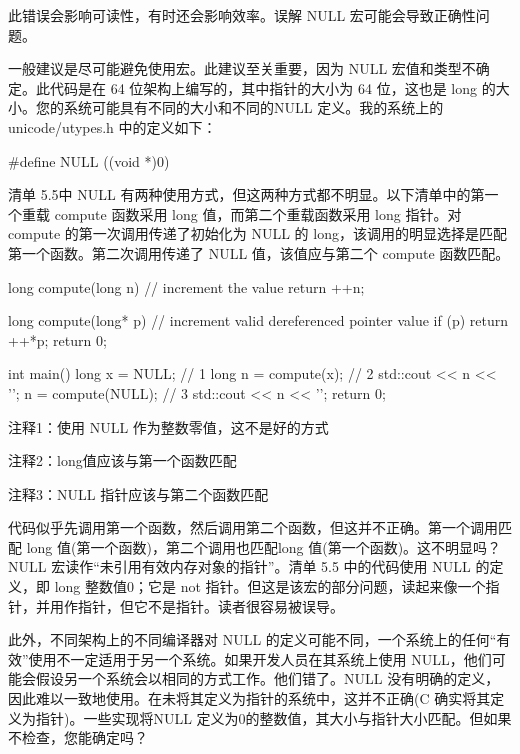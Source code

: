 此错误会影响可读性，有时还会影响效率。误解 NULL 宏可能会导致正确性问题。


一般建议是尽可能避免使用宏。此建议至关重要，因为 NULL 宏值和类型不确定。此代码是在 64 位架构上编写的，其中指针的大小为 64 位，这也是 long 的大小。您的系统可能具有不同的大小和不同的NULL 定义。我的系统上的 unicode/utypes.h 中的定义如下：

\begin{cpp}
#define NULL ((void *)0)
\end{cpp}

清单 5.5中 NULL 有两种使用方式，但这两种方式都不明显。以下清单中的第一个重载 compute 函数采用 long 值，而第二个重载函数采用 long 指针。对 compute 的第一次调用传递了初始化为 NULL 的 long，该调用的明显选择是匹配第一个函数。第二次调用传递了 NULL 值，该值应与第二个 compute 函数匹配。


\begin{cpp}
long compute(long n) { // increment the value
  return ++n;
}

long compute(long* p) { // increment valid dereferenced pointer value
  if (p)
    return ++*p;
  return 0;
}

int main() {
  long x = NULL; // 1
  long n = compute(x); // 2
  std::cout << n << '\n';
  n = compute(NULL); // 3
  std::cout << n << '\n';
  return 0;
}
\end{cpp}

{\footnotesize
注释1：使用 NULL 作为整数零值，这不是好的方式

注释2：long值应该与第一个函数匹配

注释3：NULL 指针应该与第二个函数匹配
}


代码似乎先调用第一个函数，然后调用第二个函数，但这并不正确。第一个调用匹配 long 值(第一个函数)，第二个调用也匹配long 值(第一个函数)。这不明显吗？NULL 宏读作“未引用有效内存对象的指针”。清单 5.5 中的代码使用 NULL 的定义，即 long 整数值0；它是 not 指针。但这是该宏的部分问题，读起来像一个指针，并用作指针，但它不是指针。读者很容易被误导。

此外，不同架构上的不同编译器对 NULL 的定义可能不同，一个系统上的任何“有效”使用不一定适用于另一个系统。如果开发人员在其系统上使用 NULL，他们可能会假设另一个系统会以相同的方式工作。他们错了。NULL 没有明确的定义，因此难以一致地使用。在未将其定义为指针的系统中，这并不正确(C 确实将其定义为指针)。一些实现将NULL 定义为0的整数值，其大小与指针大小匹配。但如果不检查，您能确定吗？

